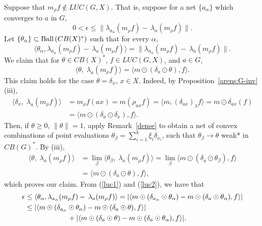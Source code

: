 Suppose that $m_\rho f \not\in LUC(G,X)$.  That is, suppose for a net $\{a_\alpha\}$ which converges to $a$ in $G$,
\begin{equation}\label{luc1}
0 < \epsilon \leq \|\lambda_{a_\alpha}(m_\rho f) -\, \lambda_a(m_\rho f) \|.
\end{equation}
Let $\{\theta_\alpha\}\subset \operatorname{Ball\,}(CB(X)^*)$ such that for every $\alpha$,
\begin{equation}\label{luc2}
\langle \theta_\alpha,\lambda_{a_\alpha}(m_\rho f) -\, \lambda_a(m_\rho f) \rangle
= \|\lambda_{a_\alpha}(m_\rho f) -\, \lambda_a(m_\rho f) \|.
\end{equation}
We claim that for $\theta \in CB(X)^*$, $f \in LUC(G,X)$, and $a \in G$,
\[
\langle \theta,\; \lambda_a(m_\rho f) \rangle = \langle m \odot \left(\delta_a \odot \theta\right), f\rangle.
\]
This claim holds for the case  $\theta = \delta_x$, $x\in X$.  Indeed, by Proposition~\ref{arens:G-inv}(iii),
\begin{align*}
\langle\delta_x,\;\lambda_a(m_\rho f) \rangle &= m_\rho f(ax) = m(\rho_{ax}f) = \langle m, (\delta_{ax})_\lambda f\rangle
= m\odot\delta_{ax}(f)\\ &= \langle m\odot(\delta_a \odot \delta_x) ,f\rangle.
\end{align*}
Then, if $\theta \geq 0$, $\|\theta\| = 1$, apply Remark~\ref{dense} to obtain a net of
convex combinations of point evaluations $\theta_\beta = \sum_{i=1}^k \xi_i \delta_{x_i}$, such
that $\theta_\beta \rightarrow \theta$ weak* in $CB(G)^*$.  By (iii),
\begin{align*}
\langle\theta,\; \lambda_a(m_\rho f) \rangle &= \lim_\beta \langle\theta_\beta ,\; \lambda_a(m_\rho f) \rangle =
\lim_\beta \langle m \odot \left(\delta_a \odot \theta_\beta \right), f\rangle \\
&= \langle m \odot \left(\delta_a \odot \theta \right), f\rangle,
\end{align*}
which proves our claim.  From (\ref{luc1}) and (\ref{luc2}), we have that
\begin{align}
\epsilon &\leq \langle \theta_\alpha,\lambda_{a_\alpha}(m_\rho f) -\, \lambda_a(m_\rho f) \rangle
         = |\langle m \odot(\delta_{a_\alpha} \odot \theta_\alpha) - m \odot(\delta_a \odot \theta_\alpha),f \rangle|\notag \\
&\leq |\langle m \odot(\delta_{a_\alpha} \odot \theta_\alpha) - m \odot(\delta_a \odot \theta),f \rangle|\label{luc3}\\
&\qquad\qquad\qquad + |\langle m \odot(\delta_a \odot \theta) - m \odot(\delta_a \odot \theta_\alpha),f \rangle|.\label{luc4}
\end{align}
